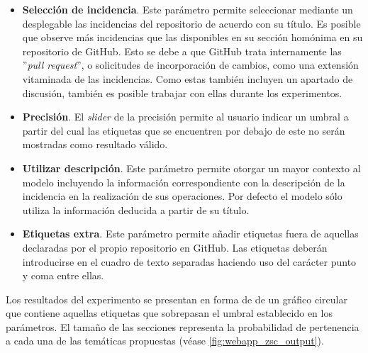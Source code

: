 \begin{itemize} \setlength\itemsep{0.2em}
    \item \textbf{Selección de incidencia}. Este parámetro permite seleccionar mediante un desplegable las incidencias del repositorio de acuerdo con su título. Es posible que observe más incidencias que las disponibles en su sección homónima en su repositorio de GitHub. Esto se debe a que GitHub trata internamente las ''\textit{pull request}'', o solicitudes de incorporación de cambios, como una extensión vitaminada de las incidencias. Como estas también incluyen un apartado de discusión, también es posible trabajar con ellas durante los experimentos.
    \item \textbf{Precisión}. El \textit{slider} de la precisión permite al usuario indicar un umbral a partir del cual las etiquetas que se encuentren por debajo de este no serán mostradas como resultado válido.
    \item \textbf{Utilizar descripción}. Este parámetro permite otorgar un mayor contexto al modelo incluyendo la información correspondiente con la descripción de la incidencia en la realización de sus operaciones. Por defecto el modelo sólo utiliza la información deducida a partir de su título.
    \item \textbf{Etiquetas extra}. Este parámetro permite añadir etiquetas fuera de aquellas declaradas por el propio repositorio en GitHub. Las etiquetas deberán introducirse en el cuadro de texto separadas haciendo uso del carácter punto y coma entre ellas.
\end{itemize}

Los resultados del experimento se presentan en forma de de un gráfico circular que contiene aquellas etiquetas que sobrepasan el umbral establecido en los parámetros. El tamaño de las secciones representa la probabilidad de pertenencia a cada una de las temáticas propuestas (véase \autoref{fig:webapp_zsc_output}).

